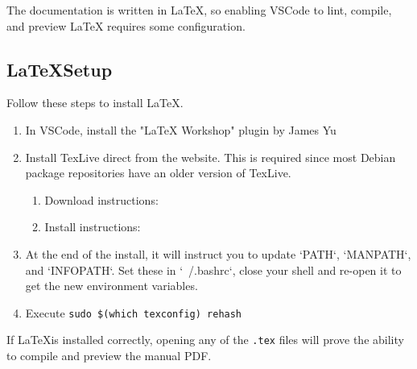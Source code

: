 The documentation is written in LaTeX, so enabling VSCode to lint, compile, and preview
LaTeX requires some configuration.

\subsection{\LaTeX\space Setup}

Follow these steps to install \LaTeX.

\begin{enumerate}
    \item In VSCode, install the "LaTeX Workshop" plugin by James Yu

    \item Install TexLive direct from the website.  This is required since
    most Debian package repositories have an older version of TexLive.
    \begin{enumerate}
        \item Download instructions: 
        \item Install instructions: 
    \end{enumerate}

    \item At the end of the install, it will instruct you to update `PATH`, `MANPATH`, and `INFOPATH`.
    Set these in `~/.bashrc`, close your shell and re-open it to get the new environment variables.

    \item Execute \texttt{sudo \$(which texconfig) rehash}

\end{enumerate}

If \LaTeX\space is installed correctly, opening any of the \texttt{.tex} files will prove the ability to
compile and preview the manual PDF.
